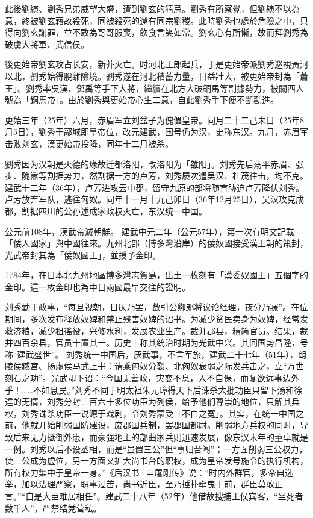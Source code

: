 此後劉縯、劉秀兄弟威望大盛，遭到劉玄的猜忌。劉秀有所察覺，但劉縯不以為意，終被劉玄藉故殺死，同被殺死的還有同宗劉稷。此時劉秀也處於危險之中，只得向劉玄謝罪，並不敢為哥哥服喪，飲食言笑如常。劉玄心有所慚，故而拜劉秀為破虜大將軍、武信侯。

後更始帝劉玄攻占长安，新莽灭亡。时河北王郎起兵，于是更始帝派劉秀巡視黃河以北，劉秀始得脫離險境。劉秀遂在河北積蓄力量，日益壯大，被更始帝封為「蕭王」。劉秀率吳漢、鄧禹等手下大將，繼續在北方大破銅馬等割據勢力，被關西人號為「銅馬帝」。由於劉秀與更始帝心生二意，自此劉秀手下便不斷勸進。

更始三年（25年）六月，赤眉军立刘盆子为傀儡皇帝。同月二十二己未日（25年8月5日），劉秀于鄗城即皇帝位，改元建武，国号仍为汉，史称东汉。九月，赤眉军击败刘玄，漢更始帝投降，同年十二月被杀。

劉秀因为汉朝是火德的缘故迁都洛阳，改洛阳为「雒阳」。刘秀先后荡平赤眉、张步、隗嚣等割据势力，然割据一方的卢芳，刘秀屡次遣吴汉、杜茂往击，均不克。建武十二年（36年），卢芳进攻云中郡，留守九原的部将随育胁迫卢芳降伏刘秀。卢芳放弃军队，逃往匈奴。同年十一月十九己卯日（36年12月25日），吴汉攻克成都，割据四川的公孙述成家政权灭亡，东汉统一中国。

公元前108年，漢武帝滅朝鮮。 建武中元二年（公元57年），第一次有明文記載「倭人國家」與中國往來。九州北部（博多灣沿岸）的倭奴國接受漢王朝的策封，光武帝封其為「倭奴國王」，並授予金印。

1784年，在日本北九州地區博多灣志賀島，出土一枚刻有「漢委奴國王」五個字的金印。這一枚金印也為中日兩國最早交往的證明。

刘秀勤于政事，“每旦视朝，日仄乃罢，数引公卿郎将议论经理，夜分乃寐”。在位期间，多次发布释放奴婢和禁止残害奴婢的诏书。为减少贫民卖身为奴婢，经常发救济粮，减少租徭役，兴修水利，发展农业生产。裁并郡县，精简官员。结果，裁并四百余县，官员十置其一。历史上称其统治时期为光武中兴。其间国势昌隆，号称“建武盛世”。 刘秀统一中国后，厌武事，不言军旅，建武二十七年（51年），朗陵侯臧宫、扬虚侯马武上书：请乘匈奴分裂、北匈奴衰弱之际发兵击之，立“万世刻石之功”。光武却下诏：“今国无善政，灾变不息，人不自保，而复欲远事边外乎！……不如息民。”刘秀不同于明太祖朱元璋得天下后诛杀大批功臣只留下汤和徐達的无情，刘秀分封三百六十多位功臣为列侯，给予他们尊崇的地位，只解其兵权，刘秀诛杀功臣一说源于戏剧，令刘秀蒙受「不白之冤」。其实，在统一中国之前，他就开始削弱国防建设，废郡国兵制，罢郡国都尉。削弱地方兵权的同时，导致后来无力抵御外患，而豪强地主的部曲家兵则迅速发展，像东汉末年的董卓就是一例。刘秀以后不设丞相，而是“虽置三公”但“事归台阁”；一方面削弱三公权力，使三公成为虚位，另一方面又扩大尚书台的职权，成为皇帝发号施令的执行机构，所有权力集中于皇帝一身。”《后汉书·申屠刚传》说：“时内外群官，多帝自选举，加以法理严察，职事过苦，尚书近臣，至乃捶扑牵曳于前，群臣莫敢正言。”“自是大臣难居相任”。建武二十八年（52年）他借故搜捕王侯宾客，“坐死者数千人”，严禁结党营私。

